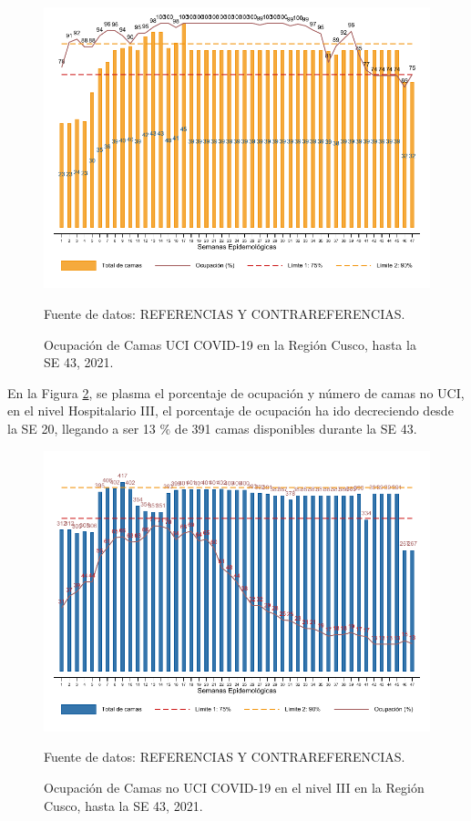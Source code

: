 \documentclass[12pt,a4paper,openany]{book}
\begin{document}
\begin{figure}[h]
	\caption{Ocupación de Camas UCI COVID-19 en la Región Cusco, hasta la SE 43, 2021.}\label{fig:ocupacion_uci}
	\begin{center}
		\includegraphics[width=0.85\linewidth]{../figuras/uci.pdf}
	\end{center}
	{\footnotesize {Fuente de datos: REFERENCIAS Y CONTRAREFERENCIAS.}}
\end{figure}

En la Figura \ref{fig:ocupacion_3_nivel}, se plasma el porcentaje de ocupación y número de camas no UCI, en el nivel Hospitalario III, el porcentaje de ocupación ha ido decreciendo desde la SE 20, llegando a ser 13 $\%$ de 391 camas disponibles durante la SE 43. 

\begin{figure}[h]
	\caption{Ocupación de Camas no UCI COVID-19 en el nivel III en la Región Cusco, hasta la SE 43, 2021.}\label{fig:ocupacion_3_nivel}
	\begin{center}
		\includegraphics[width=0.85\linewidth]{../figuras/nivel_3.pdf}
	\end{center}
	{\footnotesize {Fuente de datos: REFERENCIAS Y CONTRAREFERENCIAS.}}
\end{figure}
\end{document}
